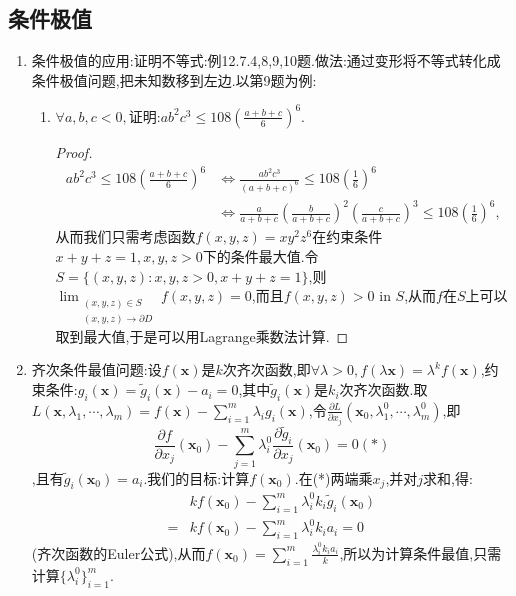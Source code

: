\documentclass[UTF8]{ctexart}
\newcommand{\p}[2]{\frac{\partial #1}{\partial #2}}
\newcommand{\x}{\boldsymbol{x}}
\begin{document}
    \subsection{条件极值}
    \begin{enumerate}[1)]
        \item 条件极值的应用:证明不等式:例12.7.4,8,9,10题.做法:通过变形将不等式转化成条件极值问题,把未知数移到左边.以第9题为例:
        \begin{enumerate}[9.]
            \item $\forall a,b,c<0,$证明:$ab^2c^3\le 108\left(\frac{a+b+c}{6}\right)^6$.
            \begin{proof}
                \begin{align*}
                    ab^2c^3\le 108\left(\frac{a+b+c}{6}\right)^6&\Leftrightarrow\frac{ab^2c^3}{(a+b+c)^6}\le 108\left(\frac{1}{6}\right)^6\\
                    &\Leftrightarrow\frac{a}{a+b+c}\left(\frac{b}{a+b+c}\right)^2\left(\frac{c}{a+b+c}\right)^3\le 108\left(\frac{1}{6}\right)^6,
                \end{align*}
                从而我们只需考虑函数$f(x,y,z)=xy^2z^6$在约束条件$x+y+z=1,x,y,z>0$下的条件最大值.令$S=\{(x,y,z):x,y,z>0,x+y+z=1\}$,则$\lim_{\substack{(x,y,z)\in S\\ (x,y,z)\to\partial D}}f(x,y,z)=0$,而且$f(x,y,z)>0$ in $S$,从而$f$在$S$上可以取到最大值,于是可以用Lagrange乘数法计算.
            \end{proof}
        \end{enumerate}
        \item 齐次条件最值问题:设$f(\x)$是$k$次齐次函数,即$\forall\lambda>0,f(\lambda\x)=\lambda^kf(\x)$,约束条件:$g_i(\x)=\tilde{g}_i(\x)-a_i=0$,其中$\tilde{g}_i(\x)$是$k_i$次齐次函数.取$L(\x,\lambda_1,\cdots,\lambda_m)=f(\x)-\sum_{i=1}^m\lambda_ig_i(\x)$,令$\p{L}{x_j}(\x_0,\lambda_1^0,\cdots,\lambda_m^0)$,即$$\p{f}{x_j}(\x_0)-\sum_{j=1}^m\lambda_i^0\p{\tilde{g}_i}{x_j}(\x_0)=0(*)$$,且有$\tilde{g}_i(\x_0)=a_i$.我们的目标:计算$f(\x_0)$.在(*)两端乘$x_j$,并对$j$求和,得:
        \begin{align*}
            &kf(\x_0)-\sum_{i=1}^m\lambda_i^0k_i\tilde{g}_i(\x_0)\\
            =&kf(\x_0)-\sum_{i=1}^m\lambda_i^0k_ia_i=0
        \end{align*}
        (齐次函数的Euler公式),从而$f(\x_0)=\sum_{i=1}^m\frac{\lambda_i^0k_ia_i}{k}$,所以为计算条件最值,只需计算$\{\lambda_i^0\}_{i=1}^m$.
    \end{enumerate}
    
\end{document}
